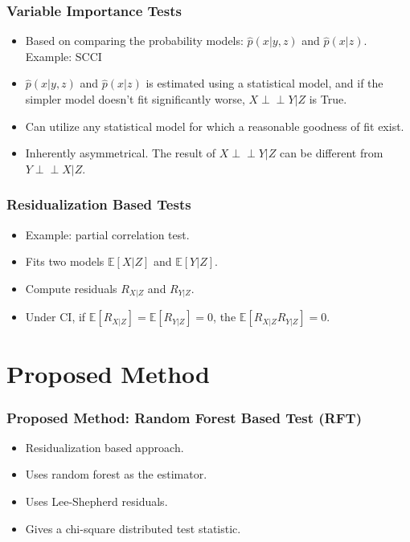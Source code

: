 \documentclass{beamer}
\def\ci{\perp\!\!\!\!\!\perp}
\begin{document}
\begin{frame}
	\frametitle{Variable Importance Tests}
	\begin{itemize}
		\setlength\itemsep{1em}
		\item Based on comparing the probability models: $\hat{p}(x | y, z) $ 
			and $ \hat{p}(x | z) $. Example: SCCI
		\item $ \hat{p}(x|y, z) $ and $ \hat{p}(x | z) $ is estimated using a
			statistical model, and if the simpler model doesn't fit
			significantly worse, $ X \ci Y | Z $ is True.
		\item Can utilize any statistical model for which a reasonable goodness
			of fit exist.
		\item Inherently asymmetrical. The result of $ X \ci Y | Z $
			can be different from $ Y \ci X | Z $.
	\end{itemize}

\end{frame}

\begin{frame}
	\frametitle{Residualization Based Tests}
	\begin{itemize}
		\setlength\itemsep{1em}
		\item Example: partial correlation test.
		\item Fits two models $ \mathbb{E}[X | Z] $ and $ \mathbb{E}[Y | Z] $.
		\item Compute residuals $ R_{X|Z} $ and $ R_{Y|Z} $.
		\item Under CI, if $ \mathbb{E}[R_{X|Z}] = \mathbb{E}[R_{Y|Z}] = 0 $, the
			$ \mathbb{E}[R_{X|Z}R_{Y|Z}] = 0 $. \footnotemark
	\end{itemize}
\end{frame}

\section{Proposed Method}
\begin{frame}
	\frametitle{Proposed Method: Random Forest Based Test (RFT)}
	\begin{itemize}
		\setlength\itemsep{1em}
		\item Residualization based approach.
		\item Uses random forest as the estimator.
		\item Uses Lee-Shepherd residuals.
		\item Gives a chi-square distributed test statistic.
	\end{itemize}
\end{frame}
\end{document}
